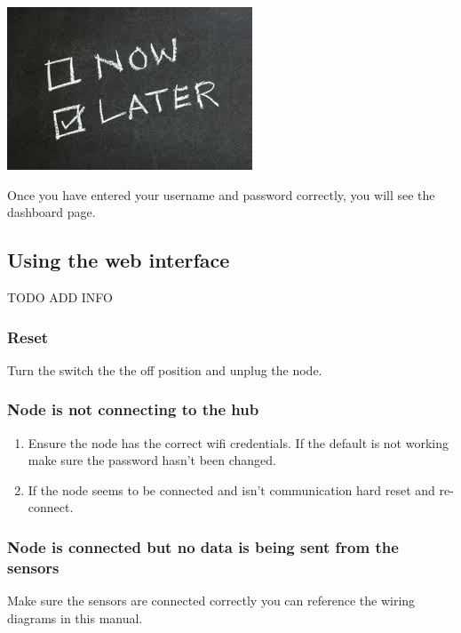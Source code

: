           \begin{center}
      \includegraphics[scale=1]{images/Now-Later.png}
    \end{center} 
      Once you have entered your username and password correctly, you will see the dashboard page.

\newpage
  \subsection{Using the web interface}
TODO ADD INFO
  \subsubsection{Reset}
  Turn the switch the the off position and unplug the node.
  \subsubsection{Node is not connecting to the hub}
  \begin{enumerate}
    \item Ensure the node has the correct wifi credentials. If the default is not
    working make sure the password hasn't been changed.
    \item If the node seems to be connected and isn't communication hard reset and re-connect.
  \end{enumerate}
  \subsubsection{Node is connected but no data is being sent from the sensors}
  Make sure the sensors are connected correctly you can reference the wiring diagrams
  in this manual.
